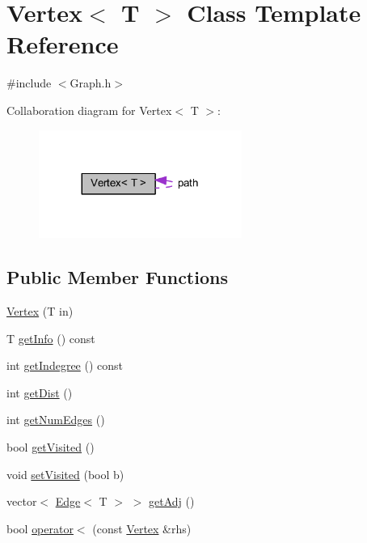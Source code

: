 \hypertarget{class_vertex}{}\section{Vertex$<$ T $>$ Class Template Reference}
\label{class_vertex}


{\ttfamily \#include $<$Graph.\+h$>$}



Collaboration diagram for Vertex$<$ T $>$\+:
\nopagebreak
\begin{figure}[H]
\begin{center}
\leavevmode
\includegraphics[width=188pt]{class_vertex__coll__graph}
\end{center}
\end{figure}
\subsection*{Public Member Functions}
\begin{DoxyCompactItemize}
\item 
\hyperlink{class_vertex_afcbdd4d4198b672356559cb8fa088408}{Vertex} (T in)
\item 
T \hyperlink{class_vertex_a48eae2f7af2362634adab02b7b2dbec6}{get\+Info} () const
\item 
int \hyperlink{class_vertex_ac78980191ea1f9d22e6617e9e511b755}{get\+Indegree} () const
\item 
int \hyperlink{class_vertex_a74863c211c94a7a5d90e565318d1434d}{get\+Dist} ()
\item 
int \hyperlink{class_vertex_ab5d881e2a8abc1de4ad8990133cae619}{get\+Num\+Edges} ()
\item 
bool \hyperlink{class_vertex_a32cb66998d594d10170f448c9a25757c}{get\+Visited} ()
\item 
void \hyperlink{class_vertex_ad68ed9cbef1d71c109081dbf81843dac}{set\+Visited} (bool b)
\item 
vector$<$ \hyperlink{class_edge}{Edge}$<$ T $>$ $>$ \hyperlink{class_vertex_aa8f7822976771f28e9a37199bcab69aa}{get\+Adj} ()
\item 
bool \hyperlink{class_vertex_aa33a3fdb63962ffc6985458b9e0c428f}{operator$<$} (const \hyperlink{class_vertex}{Vertex} \&rhs)
\end{DoxyCompactItemize}
